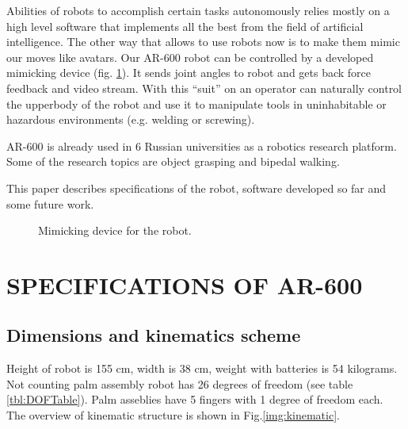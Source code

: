 \documentclass[letterpaper, 10 pt, conference]{ieeeconf}  %
\begin{document}
Abilities of robots to accomplish certain tasks autonomously relies mostly on
a high level software that implements all the best from the field of artificial
intelligence. The other way that allows to use robots now is to make them mimic
our moves like avatars. Our AR-600 robot can be controlled by a developed
mimicking device (fig. \ref{img:suit}). It sends joint angles to robot and
gets back force feedback and video stream. With this ``suit'' on an
operator can naturally control the upperbody of the robot and use it to manipulate tools in uninhabitable or hazardous environments (e.g. welding or screwing).

AR-600 is already used in 6 Russian universities as a robotics research
platform. Some of the research topics are object grasping and bipedal walking.

This paper describes specifications of the robot, software developed so far and
some future work.

\begin{figure} [thpb]
      \centering
      \caption{Mimicking device for the robot.}
      \label{img:suit}
\end{figure}

\section{SPECIFICATIONS OF AR-600}

\subsection{Dimensions and kinematics scheme}

Height of robot is 155 cm, width is 38 cm, weight with batteries is 54
kilograms.
Not counting palm assembly robot has 26 degrees of freedom (see table
\ref{tbl:DOFTable}).
Palm asseblies have 5 fingers with 1 degree of freedom each. The overview of
kinematic structure is shown in Fig.\ref{img:kinematic}.
\end{document}
